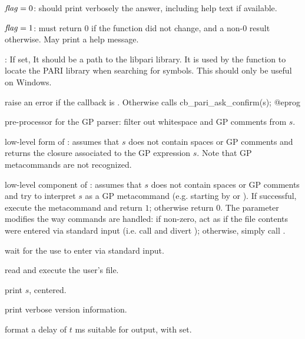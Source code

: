 \item $\hbox{\it f\kern0pt lag\/} = 0$: should print verbosely the answer, including help text if
available.

\item $\hbox{\it f\kern0pt lag\/} = 1$: must return $0$ if the function did not change, and a
non-$0$ result otherwise. May print a help message.


: If set, It should be a path to the libpari library.
It is used by the function  to locate the PARI library when
searching for symbols.  This should only be useful on Windows.


 raise an error if the
callback  is . Otherwise
calls
\bprog
  cb_pari_ask_confirm(s);
@eprog

 pre-processor for the GP
parser: filter out whitespace and GP comments from $s$.

 low-level form of
: assumes that $s$ does not contain spaces or GP comments and
returns the closure associated to the GP expression $s$. Note
that GP metacommands are not recognized.

 low-level component of
: assumes that $s$ does not contain spaces or GP comments and
try to interpret $s$ as a GP metacommand (e.g. starting by \kbd{\bs} or
). If successful, execute the metacommand and return $1$; otherwise
return $0$. The  parameter modifies the way  commands
are handled: if non-zero, act as if the file contents were entered via
standard input (i.e. call  and divert );
otherwise, simply call .

 wait for the use to enter 
via standard input.

 read and execute the user's  file.

 print $s$, centered.

 print verbose version information.

 format a delay of $t$ ms
suitable for  output, with  set.

